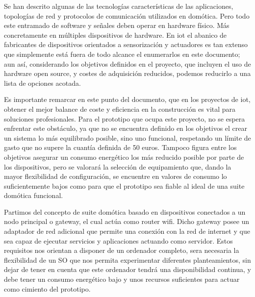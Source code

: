Se han descrito algunas de las tecnologías características de las aplicaciones, topologías de red y protocolos de comunicación utilizados en domótica. Pero todo este entramado de software y señales deben operar en hardware físico. Más concretamente en múltiples dispositivos de hardware. En \gls{iot} el abanico de fabricantes de dispositivos orientados a sensorización y actuadores es tan extenso que simplemente está fuera de todo alcance el enumerarlos en este documento; aun así, considerando los objetivos definidos en el proyecto, que incluyen el uso de hardware open source, y costes de adquisición reducidos, podemos reducirlo a una lista de opciones acotada.

\vspace{1.5cm}

Es importante remarcar en este punto del documento, que en los proyectos de \gls{iot}, obtener el mejor balance de coste y eficiencia en la construcción es vital para soluciones profesionales. Para el prototipo que ocupa este proyecto, no se espera enfrentar este obstáculo, ya que no se encuentra definido en los objetivos el crear un sistema lo más equilibrado posible, sino uno funcional, respetando un límite de gasto que no supere la cuantía definida de 50 euros. Tampoco figura entre los objetivos asegurar un consumo energético los más reducido posible por parte de los dispositivos, pero se valorará la selección de equipamiento que, dando la mayor flexibilidad de configuración, se encuentre en valores de consumo lo suficientemente bajos como para que el prototipo sea fiable al ideal de una suite domótica funcional.

\vspace{1.5cm}

Partimos del concepto de suite domótica basado en dispositivos conectados a un nodo principal o \gls{gateway}, el cual actúa como router \gls{wifi}. Dicho \gls{gateway} posee un adaptador de red adicional que permite una conexión con la red de internet y que sea capaz de ejecutar servicios y aplicaciones actuando como servidor. Estos requisitos nos orientan a disponer de un ordenador completo, sera necesaria la flexibilidad de un SO que nos permita experimentar diferentes planteamientos, sin dejar de tener en cuenta que este ordenador tendrá una disponibilidad continua, y debe tener un consumo energético bajo y unos recursos suficientes para actuar como cimiento del prototipo.

\vspace{1.5cm}

